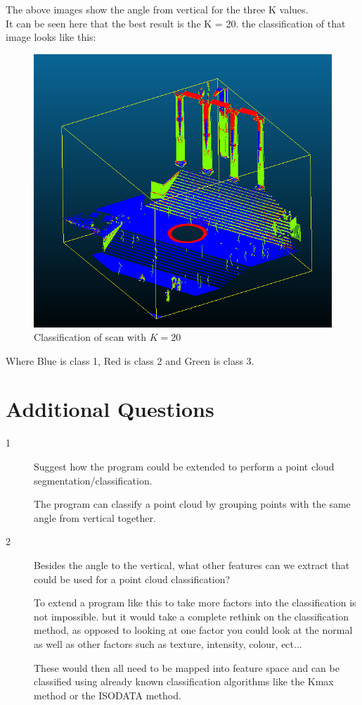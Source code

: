 \documentclass[11pt,a4paper]{article}
\begin{document}
	The above images show the angle from vertical for the three K values.
	\\
	It can be seen here that the best result is the K = 20. the classification of that image looks like this:
	\begin{figure}[H]
		\centering
		\includegraphics[width=0.4\linewidth]{./Classidfication2}
		\caption{Classification of scan with $K = 20$}
		\label{fig:Classidfication2}
	\end{figure}
	Where Blue is class 1, Red is class 2 and Green is class 3.

	\newpage
	\section{Additional Questions}

	\begin{description}
		 \item[1] Suggest how the program could be extended to perform a point cloud segmentation/classification.
		 
		 \item[] The program can classify a point cloud by grouping points with the same angle from vertical together.
		 
		 \item[2] Besides the angle to the vertical, what other features can we extract that could be used for a point cloud classification? 
		 		 
		 \item[] To extend a program like this to take more factors into the classification is not impossible. but it would take a complete rethink on the classification method, as opposed to looking at one factor you could look at the normal as well as other factors such as texture, intensity, colour, ect...
		 		 
		 These would then all need to be mapped into feature space and can be classified using already known classification algorithms like the Kmax method or the ISODATA method.

	\end{description}
	
	

	
\end{document}
